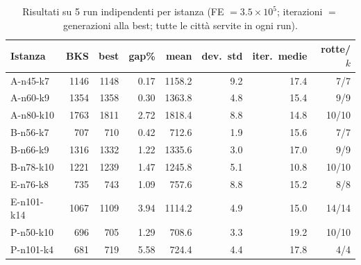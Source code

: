 \begin{table}[t]
\centering
\caption{Risultati su 5 run indipendenti per istanza (FE $= 3.5\times10^5$; iterazioni $=$ generazioni alla best; tutte le citt\`a servite in ogni run).}
\label{tab:risultati}
\begin{tabular}{lrrrrrrr}
\toprule
Istanza & BKS & best & gap\% & mean & dev.\ std & iter.\ medie & rotte/$k$ \\
\midrule
A-n45-k7 & 1146 & 1148 & 0.17 & 1158.2 & 9.2 & 17.4 & 7/7 \\
A-n60-k9 & 1354 & 1358 & 0.30 & 1363.8 & 4.8 & 15.4 & 9/9 \\
A-n80-k10 & 1763 & 1811 & 2.72 & 1818.4 & 8.8 & 14.8 & 10/10 \\
B-n56-k7 & 707 & 710 & 0.42 & 712.6 & 1.9 & 15.6 & 7/7 \\
B-n66-k9 & 1316 & 1332 & 1.22 & 1335.6 & 3.0 & 17.0 & 9/9 \\
B-n78-k10 & 1221 & 1239 & 1.47 & 1245.8 & 5.1 & 10.8 & 10/10 \\
E-n76-k8 & 735 & 743 & 1.09 & 757.6 & 8.8 & 15.2 & 8/8 \\
E-n101-k14 & 1067 & 1109 & 3.94 & 1114.2 & 4.9 & 15.0 & 14/14 \\
P-n50-k10 & 696 & 705 & 1.29 & 708.6 & 3.3 & 19.2 & 10/10 \\
P-n101-k4 & 681 & 719 & 5.58 & 724.4 & 4.4 & 17.8 & 4/4 \\
\bottomrule
\end{tabular}
\end{table}
